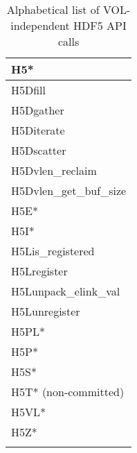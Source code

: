 \begin{longtable}{ |>{\raggedright\arraybackslash}p{\linewidth}| }
    \hline
    H5* \\
    \hline
    H5Dfill \\
    H5Dgather \\
    H5Diterate \\
    H5Dscatter \\
    H5Dvlen\_reclaim \\
    H5Dvlen\_get\_buf\_size \\
    \hline
    H5E* \\
    H5I* \\
    \hline
    H5Lis\_registered \\
    H5Lregister \\
    H5Lunpack\_elink\_val \\
    H5Lunregister \\
    \hline
    H5PL* \\
    H5P* \\
    H5S* \\
    H5T* (non-committed) \\
    H5VL* \\
    H5Z* \\
    \hline
\caption{Alphabetical list of VOL-independent HDF5 API calls}
\end{longtable}

